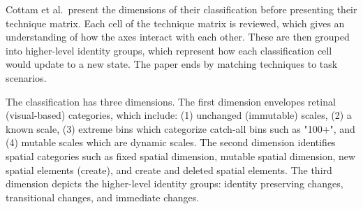 Cottam et al.\ present the dimensions of their classification before presenting their technique matrix. Each cell of the technique matrix is reviewed, which gives an understanding of how the axes interact with each other. These are then grouped into higher-level identity groups, which represent how each classification cell would update to a new state. The paper ends by matching techniques to task scenarios.

The classification has three dimensions. The first dimension envelopes retinal (visual-based) categories, which include: (1) unchanged (immutable) scales, (2) a known scale, (3) extreme bins which categorize catch-all bins such as "100+", and (4) mutable scales which are dynamic scales. The second dimension identifies spatial categories such as fixed spatial dimension, mutable spatial dimension, new spatial elements (create), and create and deleted spatial elements. The third dimension depicts the higher-level identity groups: identity preserving changes, transitional changes, and immediate changes.


%

